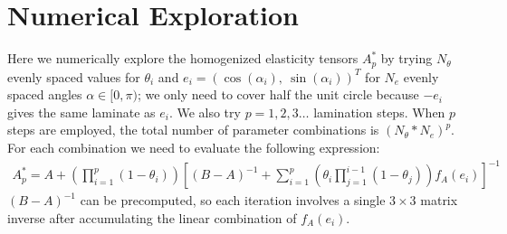 \documentclass[10pt]{article}
\begin{document}
\section{Numerical Exploration}
Here we numerically explore the homogenized elasticity tensors $A^*_p$ by
trying $N_\theta$ evenly spaced values for $\theta_i$ and $e_i = (\cos(\alpha_i),\
\sin(\alpha_i))^T$ for $N_e$ evenly spaced angles $\alpha \in [0, \pi)$; we only
need to cover half the unit circle because $-e_i$ gives the same
laminate as $e_i$. We also try $p = 1, 2, 3 \dots$ lamination steps. When $p$
steps are employed, the total number of parameter combinations is $(N_\theta *
N_e)^p$. For each combination we need to evaluate the following expression:
\begin{align}
\label{eqn:AstarSolve}
A^*_p = A + \left( \prod_{i=1}^p (1 - \theta_i) \right)
\left[\left(B - A\right)^{-1} + \sum_{i = 1}^p
\left( \theta_i \prod_{j = 1}^{i - 1} (1 - \theta_j)\right) f_A(e_i)\right]^{-1}
\end{align}
$(B - A)^{-1}$ can be precomputed, so each iteration involves a single $3 \times
3$ matrix inverse after accumulating the linear combination of $f_A(e_i)$.
\end{document}
